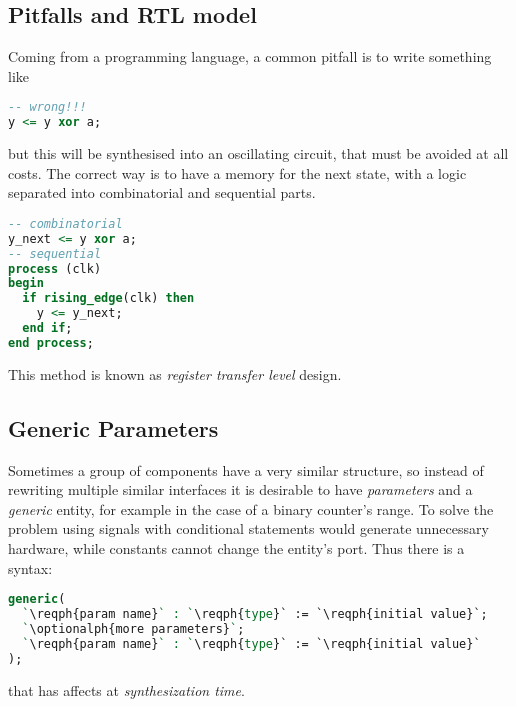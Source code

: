\subsection{Pitfalls and RTL model}
Coming from a programming language, a common pitfall is to write something like
\begin{center}
  \begin{minipage}{.4\linewidth}
    \begin{lstlisting}[language=vhdl]
-- wrong!!!
y <= y xor a;
    \end{lstlisting}
  \end{minipage}
  \begin{minipage}{.4\linewidth}
    \centering
  \end{minipage}
\end{center}
but this will be synthesised into an oscillating circuit, that must be avoided
at all costs. The correct way is to have a memory for the next state, with a
logic separated into combinatorial and sequential parts.
\begin{lstlisting}[language=vhdl]
-- combinatorial
y_next <= y xor a;
-- sequential
process (clk)
begin
  if rising_edge(clk) then
    y <= y_next;
  end if;
end process;
\end{lstlisting}
This method is known as \emph{register transfer level} design.

\subsection{Generic Parameters}
Sometimes a group of components have a very similar structure, so instead of
rewriting multiple similar interfaces it is desirable to have \emph{parameters}
and a \emph{generic} entity, for example in the case of a binary counter's
range. To solve the problem using signals with conditional statements would
generate unnecessary hardware, while constants cannot change the entity's port.
Thus there is a syntax:
\begin{lstlisting}[language=vhdl]
generic(
  `\reqph{param name}` : `\reqph{type}` := `\reqph{initial value}`;
  `\optionalph{more parameters}`;
  `\reqph{param name}` : `\reqph{type}` := `\reqph{initial value}`
);
\end{lstlisting}
that has affects at \emph{synthesization time}.

